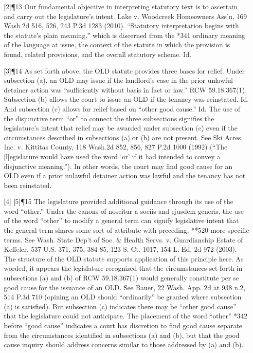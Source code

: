 \documentclass[11pt]{article}
\begin{document}
[2]¶13 Our fundamental objective in interpreting statutory text is to ascertain and carry out the legislature’s intent. Lake v. Woodcreek Homeowners Ass’n, 169 Wash.2d 516, 526, 243 P.3d 1283 (2010). “Statutory interpretation begins with the statute’s plain meaning,” which is discerned from the *341 ordinary meaning of the language at issue, the context of the statute in which the provision is found, related provisions, and the overall statutory scheme. Id.

[3]¶14 As set forth above, the OLD statute provides three bases for relief. Under subsection (a), an OLD may issue if the landlord’s case in the prior unlawful detainer action was “sufficiently without basis in fact or law.” RCW 59.18.367(1). Subsection (b) allows the court to issue an OLD if the tenancy was reinstated. Id. And subsection (c) allows for relief based on “other good cause.” Id. The use of the disjunctive term “or” to connect the three subsections signifies the legislature’s intent that relief may be awarded under subsection (c) even if the circumstances described in subsections (a) or (b) are not present. See Ski Acres, Inc. v. Kittitas County, 118 Wash.2d 852, 856, 827 P.2d 1000 (1992) (“The [l]egislature would have used the word ‘or’ if it had intended to convey a disjunctive meaning.”). In other words, the court may find good cause for an OLD even if a prior unlawful detainer action was lawful and the tenancy has not been reinstated.

[4] [5]¶15 The legislature provided additional guidance through its use of the word “other.” Under the canons of noscitur a sociis and ejusdem generis, the use of the word “other” to modify a general term can signify legislative intent that the general term shares some sort of attribute with preceding, **520 more specific terms. See Wash. State Dep’t of Soc. \& Health Servs. v. Guardianship Estate of Keffeler, 537 U.S. 371, 375, 384-85, 123 S. Ct. 1017, 154 L. Ed. 2d 972 (2003). The structure of the OLD statute supports application of this principle here. As worded, it appears the legislature recognized that the circumstances set forth in subsections (a) and (b) of RCW 59.18.367(1) would generally constitute per se good cause for the issuance of an OLD. See Bauer, 22 Wash. App. 2d at 938 n.2, 514 P.3d 710 (opining an OLD should “ordinarily” be granted where subsection (a) is satisfied). But subsection (c) indicates there may be “other good cause” that the legislature could not anticipate. The placement of the word “other” *342 before “good cause” indicates a court has discretion to find good cause separate from the circumstances identified in subsections (a) and (b), but that the good cause inquiry should address concerns similar to those addressed by (a) and (b).
\end{document}
